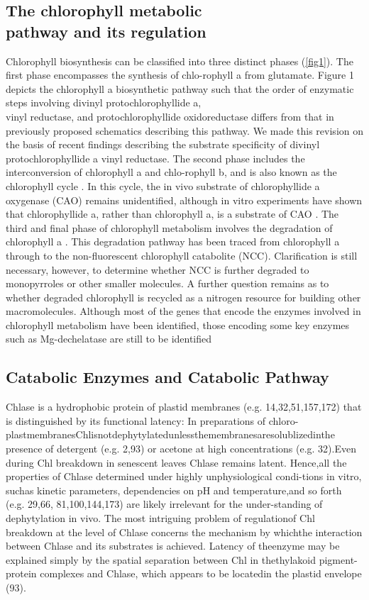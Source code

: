 \documentclass[a4paper, twocolumn, 11pt]{article}
\begin{document}
	\subsection{The chlorophyll metabolic\\ pathway and its regulation} 
	Chlorophyll biosynthesis can be classified into three distinct phases (\ref{fig1}). The first phase encompasses the synthesis of chlo-rophyll a from glutamate. Figure 1 depicts the chlorophyll a biosynthetic pathway such that the order of enzymatic steps involving divinyl protochlorophyllide a, \\vinyl reductase, and protochlorophyllide oxidoreductase differs from that in previously proposed schematics describing this pathway. We made this revision on the basis of recent findings describing the substrate specificity of divinyl protochlorophyllide a vinyl reductase. The second phase includes the interconversion of chlorophyll a and chlo-rophyll b, and is also known as the chlorophyll cycle \cite{Rudiger2002}. In this cycle, the in vivo substrate of chlorophyllide a oxygenase (CAO) remains unidentified, although in vitro experiments have shown that chlorophyllide a, rather than chlorophyll a, is a substrate of CAO \cite{Oster2000}. The third and final phase of chlorophyll metabolism involves the degradation of chlorophyll a \cite{Takamiya2000}. This degradation pathway has been traced from chlorophyll a through to the non-fluorescent chlorophyll catabolite (NCC). Clarification is still necessary, however, to determine whether NCC is further degraded to monopyrroles or other smaller molecules. A further question remains as to whether degraded chlorophyll is recycled as a nitrogen resource for building other macromolecules. Although most of the genes that encode the enzymes involved in chlorophyll metabolism have been identified, those encoding some key enzymes such as Mg-dechelatase are still to be identified \cite{Tanaka2006}
	
	\subsection{Catabolic Enzymes and Catabolic Pathway}
	Chlase is a hydrophobic protein of plastid membranes (e.g. 14,32,51,157,172) that is distinguished by its functional latency: In preparations of chloro-plastmembranesChlisnotdephytylatedunlessthemembranesaresolublizedinthe presence of detergent (e.g. 2,93) or acetone at high concentrations (e.g. 32).Even during Chl breakdown in senescent leaves Chlase remains latent. Hence,all the properties of Chlase determined under highly unphysiological condi-tions in vitro, suchas kinetic parameters, dependencies on pH and temperature,and so forth (e.g. 29,66, 81,100,144,173) are likely irrelevant for the under-standing of dephytylation in vivo. The most intriguing problem of regulationof Chl breakdown at the level of Chlase concerns the mechanism by whichthe interaction between Chlase and its substrates is achieved. Latency of theenzyme may be explained simply by the spatial separation between Chl in thethylakoid pigment-protein complexes and Chlase, which appears to be locatedin the plastid envelope (93).\\
	
\end{document}
